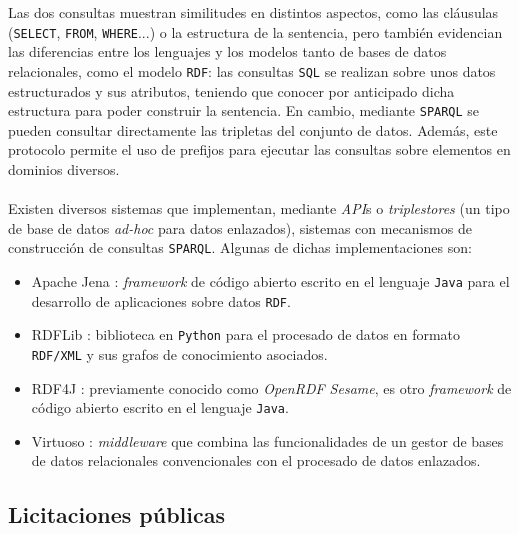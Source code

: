             \noindent Las dos consultas muestran similitudes en distintos aspectos, como las cláusulas (\texttt{SELECT}, \texttt{FROM}, \texttt{WHERE}...) o la estructura de la sentencia, pero también evidencian las diferencias entre los lenguajes y los modelos tanto de bases de datos relacionales, como el modelo \texttt{RDF}: las consultas \texttt{SQL} se realizan sobre unos datos estructurados y sus atributos, teniendo que conocer por anticipado dicha estructura para poder construir la sentencia. En cambio, mediante \texttt{SPARQL} se pueden consultar directamente las tripletas del conjunto de datos. Además, este protocolo permite el uso de prefijos para ejecutar las consultas sobre elementos en dominios diversos.
            \\ \\
            Existen diversos sistemas que implementan, mediante \textit{API}s o \textit{triplestores} (un tipo de base de datos \textit{ad-hoc} para datos enlazados), sistemas con mecanismos de construcción de consultas \texttt{SPARQL}. Algunas de dichas implementaciones son:
            \\
            \begin{itemize}
                \item Apache Jena \cite{JENA}: \textit{framework} de código abierto escrito en el lenguaje \texttt{Java} para el desarrollo de aplicaciones sobre datos \texttt{RDF}.
                \item RDFLib \cite{RDFLIB}: biblioteca en \texttt{Python} para el procesado de datos en formato \texttt{RDF/XML} y sus grafos de conocimiento asociados.
                \item RDF4J \cite{RDF4J}: previamente conocido como \textit{OpenRDF Sesame}, es otro \textit{framework} de código abierto escrito en el lenguaje \texttt{Java}.
                \item Virtuoso \cite{VIRTUOSO}: \textit{middleware} que combina las funcionalidades de un gestor de bases de datos relacionales convencionales con el procesado de datos enlazados.
            \end{itemize}
        
    \subsection{Licitaciones públicas}
